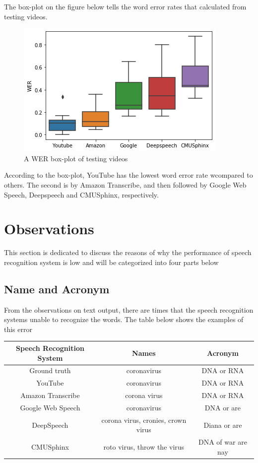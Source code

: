 \documentclass[natbib]{muthesis}
\begin{document}
 The box-plot on the figure below tells the word error rates that calculated from testing videos.
 \begin{figure}[H]
 	\centering
 	\captionsetup{justification=centering}
 	\includegraphics[width=0.7\linewidth]{images/boxplot}
 	\caption{A WER box-plot of testing videos}
 	\label{fig:wer-boxplot}
 \end{figure}
 According to the box-plot, YouTube has the lowest word error rate wcompared to others. The second is by Amazon Transcribe, and then followed by Google Web Speech, Deepspeech and CMUSphinx, respectively. 
 \section{Observations}
 This section is dedicated to discuss the reasons of why the performance of speech recognition system is low and will be categorized into four parts below
 \subsection{Name and Acronym}

 From the observations on text output, there are times that the speech recognition systems unable to recognize the words. The table below shows the examples of this error 
 \begin{center}
 	\begin{tabular}{ |c|c|c| } 
 		\hline
 		Speech Recognition System & Names & Acronym  \\ 
 		\hline
 		Ground truth & coronavirus & DNA or RNA\\
 		YouTube & coronavirus & DNA or RNA\\ 
 		Amazon Transcribe & corona virus & DNA or RNA\\
 		Google Web Speech & coronavirus & DNA or are\\
 		DeepSpeech & corona virus, cronies, crown virus &Diana or are\\
 		CMUSphinx & roto virus, throw the virus	& DNA of war are nay\\
 		\hline
 	\end{tabular}
 \end{center}
 
\end{document}
